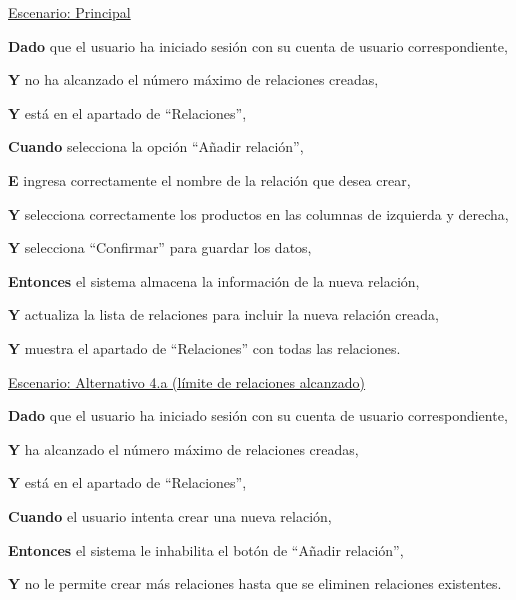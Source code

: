 \underline{Escenario: Principal}\par
\vspace{0.15cm}
\textbf{Dado} que el usuario ha iniciado sesión con su cuenta de usuario correspondiente,\par
\textbf{Y} no ha alcanzado el número máximo de relaciones creadas,\par
\textbf{Y} está en el apartado de \enquote{Relaciones},\par
\textbf{Cuando} selecciona la opción \enquote{Añadir relación},\par
\textbf{E} ingresa correctamente el nombre de la relación que desea crear,\par
\textbf{Y} selecciona correctamente los productos en las columnas de izquierda y derecha,\par
\textbf{Y} selecciona \enquote{Confirmar} para guardar los datos,\par
\textbf{Entonces} el sistema almacena la información de la nueva relación,\par
\textbf{Y} actualiza la lista de relaciones para incluir la nueva relación creada,\par
\textbf{Y} muestra el apartado de \enquote{Relaciones} con todas las relaciones.\par

\vspace{0.20cm}

\underline{Escenario: Alternativo 4.a (límite de relaciones alcanzado)}\par
\vspace{0.15cm}
\textbf{Dado} que el usuario ha iniciado sesión con su cuenta de usuario correspondiente,\par
\textbf{Y} ha alcanzado el número máximo de relaciones creadas,\par
\textbf{Y} está en el apartado de \enquote{Relaciones},\par
\textbf{Cuando} el usuario intenta crear una nueva relación,\par
\textbf{Entonces} el sistema le inhabilita el botón de \enquote{Añadir relación},\par
\textbf{Y} no le permite crear más relaciones hasta que se eliminen relaciones existentes.\par

\newpage %

